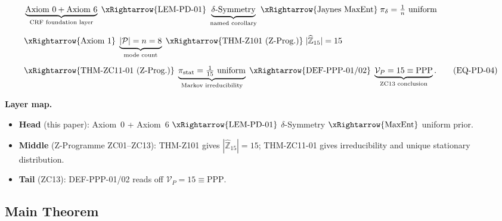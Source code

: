 \documentclass[12pt, a4paper]{article}
\begin{document}
\begin{keybox}[title={EQ-PD-01: The Closed Bridge
  (Direct Derivation of PPP from Axiom~0 and Axiom~6)}]
\begin{align}
  &\underbrace{\text{Axiom~0} + \text{Axiom~6}}_{\text{CRF
    foundation layer}}
  \;\xRightarrow{\text{LEM-PD-01}}\;
  \underbrace{\delta\text{-Symmetry}}_{\text{named corollary}}
  \;\xRightarrow{\text{Jaynes MaxEnt}}\;
  \pi_\delta = \tfrac{1}{n}\text{ uniform}
  \notag\\[6pt]
  &\xRightarrow{\text{Axiom~1}}\;
  \underbrace{|\mathcal{P}| = n = 8}_{\text{mode count}}
  \;\xRightarrow{\text{THM-Z101 (Z-Prog.)}}\;
  |\widehat{\mathbb{Z}}_{15}| = 15
  \notag\\[6pt]
  &\xRightarrow{\text{THM-ZC11-01 (Z-Prog.)}}\;
  \underbrace{\pi_{\rm stat} = \tfrac{1}{15}
  \text{ uniform}}_{\text{Markov irreducibility}}
  \;\xRightarrow{\text{DEF-PPP-01/02}}\;
  \underbrace{\mathcal{V}_P = 15 \equiv
  \text{PPP}}_{\text{ZC13 conclusion}}.
  \tag{EQ-PD-04}\label{zc14:eq:bridge}
\end{align}

\textbf{Layer map.}
\begin{itemize}[leftmargin=*, noitemsep]
  \item \textbf{Head} (this paper): Axiom~0 + Axiom~6
    $\xRightarrow{\text{LEM-PD-01}}$ $\delta$-Symmetry
    $\xRightarrow{\text{MaxEnt}}$ uniform prior.
  \item \textbf{Middle} (Z-Programme ZC01--ZC13): THM-Z101
    gives $|\widehat{\mathbb{Z}}_{15}|=15$; THM-ZC11-01
    gives irreducibility and unique stationary distribution.
  \item \textbf{Tail} (ZC13): DEF-PPP-01/02 reads off
    $\mathcal{V}_P=15 \equiv \text{PPP}$.
\end{itemize}
\end{keybox}

\subsection{Main Theorem}
\label{zc14:sec:theorem}
\end{document}
